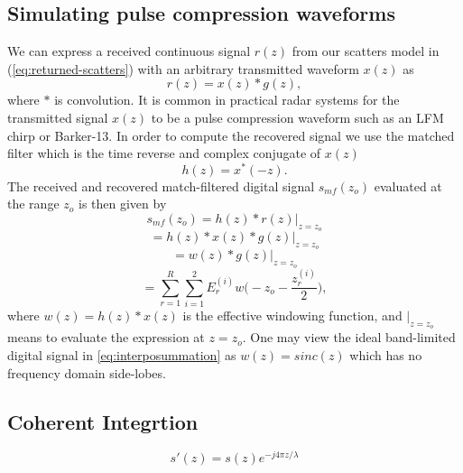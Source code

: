 \documentclass[onecolumn]{IEEEtran}
\begin{document}
\subsection{Simulating pulse compression waveforms}

We can express a received continuous signal $r(z)$ from our scatters model in (\ref{eq:returned-scatters}) with an arbitrary transmitted waveform $x(z)$ as 
\begin{equation}
    r(z) = x(z) * g(z)
    ,
\end{equation}
where $*$ is convolution. It is common in practical radar systems for the transmitted signal $x(z)$ to be a pulse compression waveform such as an LFM chirp or Barker-13. In order to compute the recovered signal we use the matched filter which is the time reverse and complex conjugate of $x(z)$
\begin{equation}
    h(z) = x^*(-z)
    .
\end{equation}
The received and recovered match-filtered digital signal $s_{mf}(z_o)$ evaluated at the range $z_o$ is then given by 
\begin{equation}
    s_{mf}(z_o) = h(z)*r(z) |_{z=z_o}
\end{equation}
\begin{equation}
    = h(z)*x(z)*g(z) |_{z=z_o}
\end{equation}
\begin{equation}
    =w(z)*g(z) |_{z=z_o}
\end{equation}
\begin{equation}
    =\sum_{r=1}^{R}\sum_{i=1}^{2}E_r^{(i)}w\bigg(-z_o-\frac{z_r^{(i)}}{2}\bigg)
    ,
\end{equation}
where $w(z) = h(z) * x(z)$ is the effective windowing function, and $|_{z=z_o}$ means to evaluate the expression at $z=z_o$. One may view the ideal band-limited digital signal in \ref{eq:interposummation} as $w(z)=sinc(z)$ which has no frequency domain side-lobes.

\subsection{Coherent Integrtion}
\begin{equation}
    s'(z) = s(z)e^{-j4\pi z/\lambda}
\end{equation}
\end{document}
